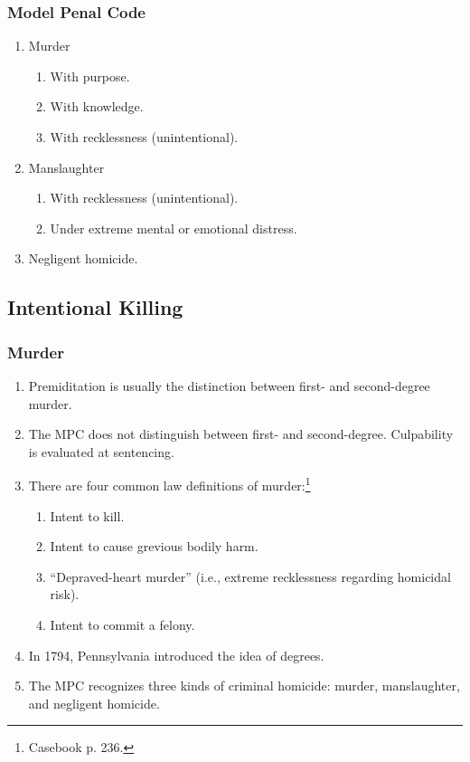 \subsubsection{Model Penal Code}

\begin{enumerate}
    \item Murder
    \begin{enumerate}
        \item With purpose.
        \item With knowledge.
        \item With recklessness (unintentional).
    \end{enumerate}
    \item Manslaughter
    \begin{enumerate}
        \item With recklessness (unintentional).
        \item Under extreme mental or emotional distress.
    \end{enumerate}
    \item Negligent homicide.
\end{enumerate}

\subsection{Intentional Killing}

\subsubsection{Murder}

\begin{enumerate}
    \item Premiditation is usually the distinction between first- and second-degree murder.
    \item The MPC does not distinguish between first- and second-degree. Culpability is evaluated at sentencing.
    \item There are four common law definitions of murder:\footnote{Casebook p. 236.}
    \begin{enumerate}
        \item Intent to kill.
        \item Intent to cause grevious bodily harm.
        \item ``Depraved-heart murder'' (i.e., extreme recklessness regarding homicidal risk).
        \item Intent to commit a felony.
    \end{enumerate}
    \item In 1794, Pennsylvania introduced the idea of degrees.
    \item The MPC recognizes three kinds of criminal homicide: murder, manslaughter, and negligent homicide.
\end{enumerate}

